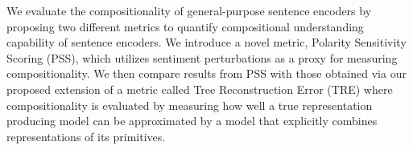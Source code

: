 We evaluate the compositionality of general-purpose sentence encoders by proposing two different metrics to quantify compositional understanding capability of sentence encoders. We introduce a novel metric, Polarity Sensitivity Scoring (PSS), which utilizes sentiment perturbations as a proxy for measuring compositionality. We then compare results from PSS  with those obtained via our proposed extension of a metric called Tree Reconstruction Error (TRE) \citep{andreas2019measuring} where compositionality is evaluated by measuring how well a true representation producing model can be approximated by a model that explicitly combines representations of its primitives.
